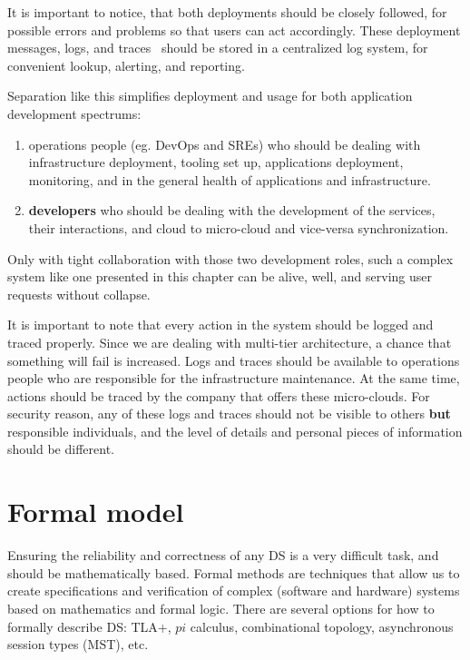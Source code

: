 It is important to notice, that both deployments should be closely followed, for possible errors and problems so that users can act accordingly. These deployment messages, logs, and traces~\cite{36356} should be stored in a centralized log system, for convenient lookup, alerting, and reporting.

Separation like this simplifies deployment and usage for both application development spectrums: 

\begin{enumerate}[start=1,label={(\bfseries \roman*)}]
	\item operations people (eg. DevOps and SREs) who should be dealing with infrastructure deployment, tooling set up, applications deployment, monitoring, and in the general health of applications and infrastructure.
	\item \textbf{developers} who should be dealing with the development of the services, their interactions, and cloud to micro-cloud and vice-versa synchronization.
\end{enumerate}

\noindent
Only with tight collaboration with those two development roles, such a complex system like one presented in this chapter can be alive, well, and serving user requests without collapse.

It is important to note that every action in the system should be logged and traced properly. Since we are dealing with multi-tier architecture, a chance that something will fail is increased. Logs and traces should be available to operations people who are responsible for the infrastructure maintenance. At the same time, actions should be traced by the company that offers these micro-clouds. For security reason, any of these logs and traces should not be visible to others \textbf{but} responsible individuals, and the level of details and personal pieces of information should be different.
%
%
\section{Formal model}\label{sec:formal_model}
%
Ensuring the reliability and correctness of any DS is a very difficult task, and should be mathematically based. Formal methods are techniques that allow us to create specifications and verification of complex (software and hardware) systems based on mathematics and formal logic. There are several options for how to formally describe DS: TLA+, $pi$ calculus, combinational topology, asynchronous session types (MST), etc. 

